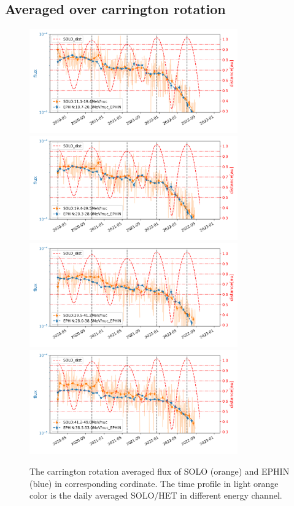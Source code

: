 \subsection{Averaged over carrington rotation}

\begin{figure}
    \centering
    \includegraphics[width = 0.8\textwidth, height = 0.2\textheight]{images/ACR/seperate_mask_1-3/Carrington_SOLO_11.1-19.4MeV_EPHIN_10.7-20.3MeV.png}
    \includegraphics[width = 0.8\textwidth,height = 0.2\textheight]{images/ACR/seperate_mask_1-3/Carrington_SOLO_19.4-29.5MeV_EPHIN_20.3-28.0MeV.png}
    \includegraphics[width = 0.8\textwidth,height = 0.2\textheight]{images/ACR/seperate_mask_1-3/Carrington_SOLO_29.5-41.2MeV_EPHIN_28.0-38.5MeV.png}
    \includegraphics[width = 0.8\textwidth,height = 0.2\textheight]{images/ACR/seperate_mask_1-3/Carrington_SOLO_41.2-49.0MeV_EPHIN_38.5-53.0MeV.png}
    \caption{The carrington rotation averaged flux of SOLO (orange) and EPHIN (blue) in corresponding cordinate. The time profile in light orange color is the daily averaged SOLO/HET in different energy channel.}
    \label{fig:carrington_flux}
\end{figure}

